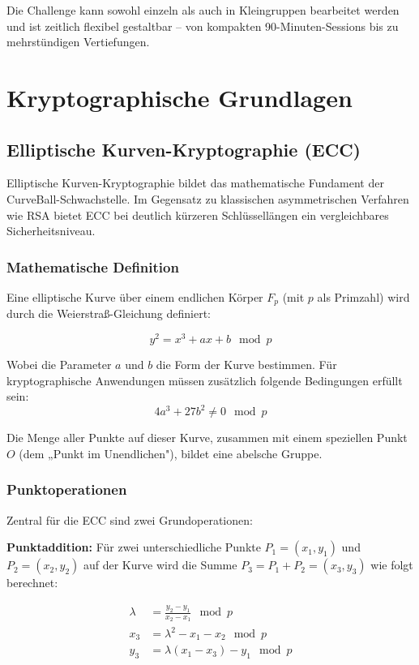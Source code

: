 \documentclass{article}
\begin{document}
\noindent
Die Challenge kann sowohl einzeln als auch in Kleingruppen bearbeitet werden und ist zeitlich flexibel gestaltbar – von kompakten 90-Minuten-Sessions bis zu mehrstündigen Vertiefungen.

\newpage

\section{Kryptographische Grundlagen}

\subsection{Elliptische Kurven-Kryptographie (ECC)}
Elliptische Kurven-Kryptographie bildet das mathematische Fundament der CurveBall-Schwachstelle. Im Gegensatz zu klassischen asymmetrischen Verfahren wie RSA bietet ECC bei deutlich kürzeren Schlüssellängen ein vergleichbares Sicherheitsniveau.

\subsubsection{Mathematische Definition}
Eine elliptische Kurve über einem endlichen Körper \(F_p\) (mit \(p\) als Primzahl) wird durch die Weierstraß-Gleichung definiert:

\begin{equation}
y^2 = x^3 + ax + b \mod p
\end{equation}

Wobei die Parameter \(a\) und \(b\) die Form der Kurve bestimmen. Für kryptographische Anwendungen müssen zusätzlich folgende Bedingungen erfüllt sein:
\begin{equation}
4a^3 + 27b^2 \neq 0 \mod p
\end{equation}

Die Menge aller Punkte auf dieser Kurve, zusammen mit einem speziellen Punkt \(O\) (dem „Punkt im Unendlichen"), bildet eine abelsche Gruppe.

\subsubsection{Punktoperationen}
Zentral für die ECC sind zwei Grundoperationen:

\textbf{Punktaddition:} Für zwei unterschiedliche Punkte \(P_1 = (x_1, y_1)\) und \(P_2 = (x_2, y_2)\) auf der Kurve wird die Summe \(P_3 = P_1 + P_2 = (x_3, y_3)\) wie folgt berechnet:

\begin{align}
\lambda &= \frac{y_2 - y_1}{x_2 - x_1} \mod p \\
x_3 &= \lambda^2 - x_1 - x_2 \mod p \\
y_3 &= \lambda(x_1 - x_3) - y_1 \mod p
\end{align}
\end{document}
